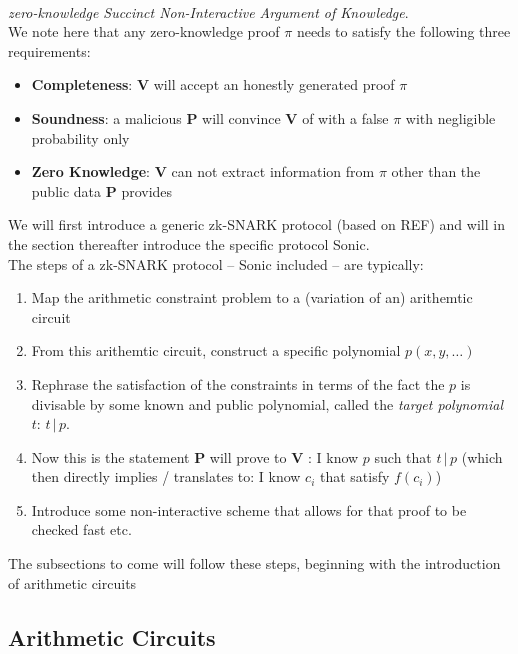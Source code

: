 \documentclass[11pt,oneside]{article}
\newcommand{\bP}{\textbf{P} }
\newcommand{\bV}{\textbf{V} }
\theoremstyle{definition}
\theoremstyle{remark}
\numberwithin{equation}{section}
\begin{document}
 \\ \indent\emph{zero-knowledge Succinct Non-Interactive Argument of Knowledge}.
\\
We note here that any zero-knowledge proof $\pi$ needs to satisfy the following three requirements:
\begin{itemize}
\item \textbf{Completeness}: \bV will accept an honestly generated proof $\pi$
\item \textbf{Soundness}: a malicious \bP will convince \bV of with a false $\pi$ with negligible probability only 
\item \textbf{Zero Knowledge}: \bV can not extract information from $\pi$ other than the public data \bP provides
\end{itemize}
We will first introduce a generic zk-SNARK protocol (based on REF) and will in the section thereafter introduce the specific protocol Sonic.\\ \newline
The steps of a zk-SNARK protocol -- Sonic included -- are typically:

\begin{enumerate}
\item Map the arithmetic constraint problem to a (variation of an) arithemtic circuit
\item From this arithemtic circuit, construct a specific polynomial $p(x,y,\ldots)$
\item Rephrase the satisfaction of the constraints in terms of the fact the $p$ is divisable by some known and public polynomial, called the \emph{target polynomial} $t$: $t\,|\,p$.
\item Now this is the statement \bP will prove to \bV: I know $p$ such that $t\,|\,p$ (which then directly implies / translates to: I know $c_i$ that satisfy $f(c_i)$)
\item Introduce some non-interactive scheme that allows for that proof to be checked fast etc.
\end{enumerate}

The subsections to come will follow these steps, beginning with the introduction of arithmetic circuits

\subsection{Arithmetic Circuits}\label{sec:circuits:arith}
\end{document}
